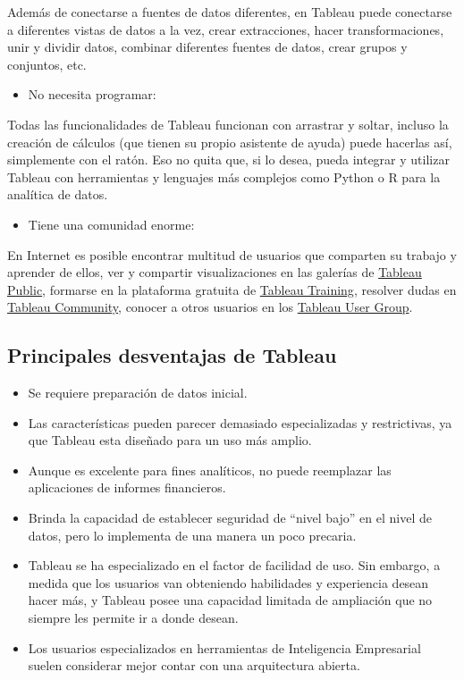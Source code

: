 \documentclass[
]{book}
\providecommand{\tightlist}{%
  \setlength{\itemsep}{0pt}\setlength{\parskip}{0pt}}
\begin{document}
Además de conectarse a fuentes de datos diferentes, en Tableau puede conectarse a diferentes vistas de datos a la vez, crear extracciones, hacer transformaciones, unir y dividir datos, combinar diferentes fuentes de datos, crear grupos y conjuntos, etc.

\begin{itemize}
\tightlist
\item
  No necesita programar:
\end{itemize}

Todas las funcionalidades de Tableau funcionan con arrastrar y soltar, incluso la creación de cálculos (que tienen su propio asistente de ayuda) puede hacerlas así, simplemente con el ratón.
Eso no quita que, si lo desea, pueda integrar y utilizar Tableau con herramientas y lenguajes más complejos como Python o R para la analítica de datos.

\begin{itemize}
\tightlist
\item
  Tiene una comunidad enorme:
\end{itemize}

En Internet es posible encontrar multitud de usuarios que comparten su trabajo y aprender de ellos, ver y compartir visualizaciones en las galerías de \href{https://public.tableau.com/en-us/s/}{Tableau Public}, formarse en la plataforma gratuita de \href{https://www.tableau.com/learn/training/20203}{Tableau Training}, resolver dudas en \href{https://community.tableau.com/s/}{Tableau Community}, conocer a otros usuarios en los \href{https://usergroups.tableau.com/}{Tableau User Group}.

\hypertarget{principales-desventajas-de-tableau}{%
\subsection{Principales desventajas de Tableau}\label{principales-desventajas-de-tableau}}

\begin{itemize}
\tightlist
\item
  Se requiere preparación de datos inicial.
\item
  Las características pueden parecer demasiado especializadas y restrictivas, ya que Tableau esta diseñado para un uso más amplio.
\item
  Aunque es excelente para fines analíticos, no puede reemplazar las aplicaciones de informes financieros.\\
\item
  Brinda la capacidad de establecer seguridad de ``nivel bajo'' en el nivel de datos, pero lo implementa de una manera un poco precaria.
\item
  Tableau se ha especializado en el factor de facilidad de uso. Sin embargo, a medida que los usuarios van obteniendo habilidades y experiencia desean hacer más, y Tableau posee una capacidad limitada de ampliación que no siempre les permite ir a donde desean.
\item
  Los usuarios especializados en herramientas de Inteligencia Empresarial suelen considerar mejor contar con una arquitectura abierta.
\end{itemize}
\end{document}
